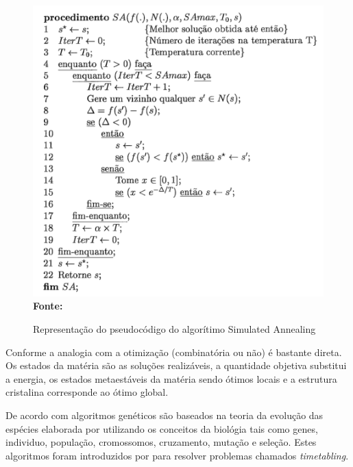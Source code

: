 \begin{figure}[!htb]
\caption[Representação do pseudocódigo do algorítimo Simulated Annealing]{Representação do pseudocódigo do algorítimo Simulated Annealing}
\label{fig:figura2}
\centering
\includegraphics[scale=0.55]{imagens/representacaoSimulatedAnnealing.png}
\\ \textbf{\footnotesize Fonte: \cite{souza2002experiencias}}
\end{figure}

Conforme \cite{aarts1988simulated} a analogia com a otimização (combinatória ou não) é bastante direta. Os estados da matéria são as soluções realizáveis, a quantidade objetiva substitui a energia, os estados metaestáveis da matéria sendo ótimos locais e a estrutura cristalina corresponde ao ótimo global.\par 




De acordo com \cite{goldberg1989genetic} algoritmos genéticos são baseados na teoria da evolução das espécies elaborada por \cite{darwin1968origin} utilizando os conceitos da biológia tais como genes, individuo, população, cromossomos, cruzamento, mutação e seleção. Estes algoritmos foram introduzidos por \cite{holland1975adaptation} para resolver problemas chamados \textit{timetabling}.

